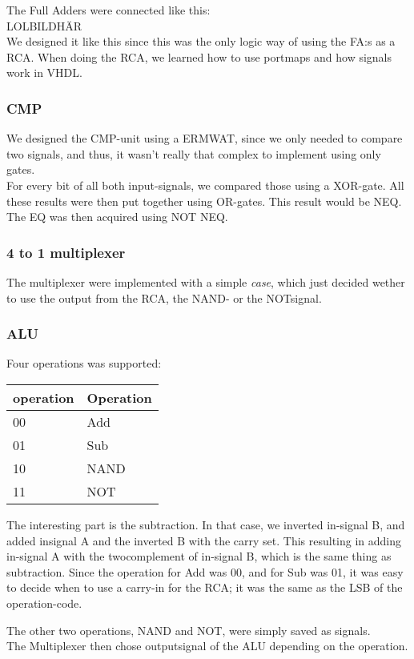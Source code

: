 \documentclass[a4paper]{article}
\begin{document}
The Full Adders were connected like this:\\
LOLBILDHÄR\\

We designed it like this since this was the only logic way of using the FA:s as a RCA. 
When doing the RCA, we learned how to use portmaps and how signals work in VHDL.

\subsubsection{CMP}
We designed the CMP-unit using a ERMWAT, since we only needed to compare two signals, and thus, it wasn't really that complex to implement using only gates.\\
For every bit of all both input-signals, we compared those using a XOR-gate. All these results were then put together using OR-gates. This result would be NEQ. The EQ was then acquired using NOT NEQ.


\subsubsection{4 to 1 multiplexer}
The multiplexer were implemented with a simple \emph{case}, which just decided wether to use the output from the RCA, the NAND- or the NOTsignal.

\subsubsection{ALU}
Four operations was supported:\\
\begin{tabular} {|l|l|} \hline
operation & Operation \\
\hline 00 & Add  \\
\hline 01 & Sub \\
\hline 10 & NAND \\
\hline 11 & NOT \\
\hline
\end{tabular}

The interesting part is the subtraction. In that case, we inverted in-signal B, and added insignal A and the inverted B with the carry set. This resulting in adding in-signal A with the twocomplement of in-signal B, which is the same thing as subtraction.
Since the operation for Add was 00, and for Sub was 01, it was easy to decide when to use a carry-in for the RCA; it was the same as the LSB of the operation-code.

The other two operations, NAND and NOT, were simply saved as signals.\\
The Multiplexer then chose outputsignal of the ALU depending on the operation.\\
\end{document}
